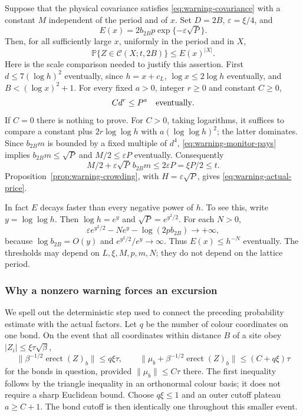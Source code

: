 Suppose that the physical covariance satisfies
\eqref{eq:warning-covariance} with a constant $M$ independent of the
period and of $x$. Set $D=2B$, $\varepsilon=\xi/4$, and
\begin{equation}\label{eq:warning-price}
 E(x)=2b_{2B}p\exp\{-\varepsilon\sqrt P\}.
\end{equation}
Then, for all sufficiently large $x$, uniformly in the period and
in $X$,
\begin{equation}\label{eq:warning-actual-price}
 \mathbb P\{Z\in\mathcal C(X;t,2B)\}\le E(x)^{|X|}.
\end{equation}
Here is the scale comparison needed to justify this assertion. First
$d\le7(\log h)^2$ eventually, since $h=x+c_L$, $\log x\le2\log h$
eventually, and $B<(\log x)^2+1$. For every fixed $a>0$, integer
$r\ge0$ and constant $C\ge0$,
\begin{equation}\label{eq:warning-monitor-pays}
 C d^r\le P^a\quad\hbox{eventually}.
\end{equation}
If $C=0$ there is nothing to prove. For $C>0$, taking logarithms,
it suffices to compare a constant plus
$2r\log\log h$ with $a(\log\log h)^2$; the latter dominates.
Since $b_{2B}m$ is bounded by a fixed multiple of $d^4$,
\eqref{eq:warning-monitor-pays} implies
$b_{2B}m\le\sqrt P$ and $M/2\le\varepsilon P$ eventually. Consequently
\[
 M/2+\varepsilon\sqrt P\,b_{2B}m
 \le2\varepsilon P=\xi P/2\le t.
\]
Proposition~\ref{prop:warning-crowding}, with $H=\varepsilon\sqrt P$,
gives \eqref{eq:warning-actual-price}.

In fact $E$ decays faster than every negative power of $h$. To see this,
write $y=\log\log h$. Then $\log h=e^y$ and
$\sqrt P=e^{y^2/2}$. For each $N>0$,
\[
 \varepsilon e^{y^2/2}-N e^y-\log(2pb_{2B})\longrightarrow+\infty,
\]
because $\log b_{2B}=O(y)$ and $e^{y^2/2}/e^y\to\infty$.
Thus $E(x)\le h^{-N}$ eventually. The thresholds may depend on
$L,\xi,M,p,m,N$; they do not depend on the lattice period.

\subsubsection{Why a nonzero warning forces an excursion}
We spell out the deterministic step used to connect the preceding
probability estimate with the actual factors. Let $q$ be the number of
colour coordinates on one bond. On the event that all coordinates
within distance $B$ of a site obey $|Z_i|\le\xi\tau\sqrt\beta$,
\[
 \|\beta^{-1/2}\operatorname{erect}(Z)_b\|\le q\xi\tau,
 \qquad
 \|\mu_b+\beta^{-1/2}\operatorname{erect}(Z)_b\|
       \le (C+q\xi)\tau
\]
for the bonds in question, provided $\|\mu_b\|\le C\tau$ there.
The first inequality follows by the triangle inequality in an
orthonormal colour basis; it does not require a sharp Euclidean bound.
Choose $q\xi\le1$ and an outer cutoff plateau $a\ge C+1$.
The bond cutoff is then identically one throughout this smaller event.

